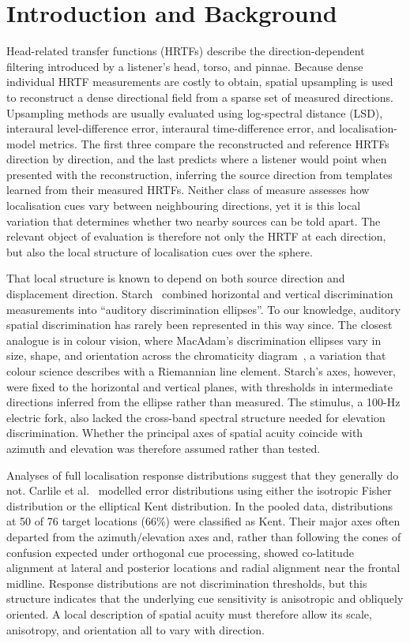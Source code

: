 \documentclass[journal]{IEEEtran}
\begin{document}
\section{Introduction and Background}

Head-related transfer functions (HRTFs) describe the direction-dependent filtering introduced by a listener's head, torso, and pinnae. Because dense individual HRTF measurements are costly to obtain, spatial upsampling is used to reconstruct a dense directional field from a sparse set of measured directions. Upsampling methods are usually evaluated using log-spectral distance (LSD), interaural level-difference error, interaural time-difference error, and localisation-model metrics. The first three compare the reconstructed and reference HRTFs direction by direction, and the last predicts where a listener would point when presented with the reconstruction, inferring the source direction from templates learned from their measured HRTFs. Neither class of measure assesses how localisation cues vary between neighbouring directions, yet it is this local variation that determines whether two nearby sources can be told apart. The relevant object of evaluation is therefore not only the HRTF at each direction, but also the local structure of localisation cues over the sphere.

That local structure is known to depend on both source direction and displacement direction. Starch~\cite{Starch1905} combined horizontal and vertical discrimination measurements into ``auditory discrimination ellipses''. To our knowledge, auditory spatial discrimination has rarely been represented in this way since. The closest analogue is in colour vision, where MacAdam's discrimination ellipses vary in size, shape, and orientation across the chromaticity diagram~\cite{MacAdam1942}, a variation that colour science describes with a Riemannian line element. Starch's axes, however, were fixed to the horizontal and vertical planes, with thresholds in intermediate directions inferred from the ellipse rather than measured. The stimulus, a 100-Hz electric fork, also lacked the cross-band spectral structure needed for elevation discrimination. Whether the principal axes of spatial acuity coincide with azimuth and elevation was therefore assumed rather than tested.

Analyses of full localisation response distributions suggest that they generally do not. Carlile et al.~\cite{Carlile1997} modelled error distributions using either the isotropic Fisher distribution or the elliptical Kent distribution. In the pooled data, distributions at 50 of 76 target locations (66\%) were classified as Kent. Their major axes often departed from the azimuth/elevation axes and, rather than following the cones of confusion expected under orthogonal cue processing, showed co-latitude alignment at lateral and posterior locations and radial alignment near the frontal midline. Response distributions are not discrimination thresholds, but this structure indicates that the underlying cue sensitivity is anisotropic and obliquely oriented. A local description of spatial acuity must therefore allow its scale, anisotropy, and orientation all to vary with direction.
\end{document}
